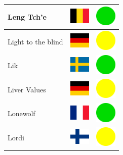 \documentclass[12pt, a4paper, twoside]{report}
\begin{document}
\begin{center}
\begin{longtable}{|p{5cm}|p{2cm}|p{2cm}|}
			Leng Tch'e & \includegraphics[width=1cm]{4x3/be} & \includegraphics[width=1cm]{likes/y} \\ \hline
			Light to the blind & \includegraphics[width=1cm]{4x3/de} & \includegraphics[width=1cm]{likes/m} \\ \hline
			Lik & \includegraphics[width=1cm]{4x3/se} & \includegraphics[width=1cm]{likes/y} \\ \hline
			Liver Values & \includegraphics[width=1cm]{4x3/de} & \includegraphics[width=1cm]{likes/m} \\ \hline
			Lonewolf & \includegraphics[width=1cm]{4x3/fr} & \includegraphics[width=1cm]{likes/y} \\ \hline
			Lordi & \includegraphics[width=1cm]{4x3/fi} & \includegraphics[width=1cm]{likes/m} \\ \hline

\end{longtable}
\end{center}
\end{document}
